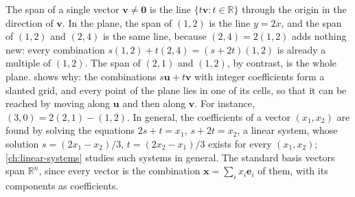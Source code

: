 The span of a single vector $\mathbf v\ne\mathbf 0$ is the line $\{t\mathbf v: t\in\mathbb R\}$ through the origin in the direction of $\mathbf v$. In the plane, the span of $(1,2)$ is the line $y=2x$, and the span of $(1,2)$ and $(2,4)$ is the same line, because $(2,4)=2(1,2)$ adds nothing new: every combination $s(1,2)+t(2,4)=(s+2t)(1,2)$ is already a multiple of $(1,2)$. The span of $(2,1)$ and $(1,2)$, by contrast, is the whole plane.  shows why: the combinations $s\mathbf u+t\mathbf v$ with integer coefficients form a slanted grid, and every point of the plane lies in one of its cells, so that it can be reached by moving along $\mathbf u$ and then along $\mathbf v$. For instance, $(3,0)=2(2,1)-(1,2)$. In general, the coefficients of a vector $(x_1,x_2)$ are found by solving the equations $2s+t=x_1$, $s+2t=x_2$, a linear system, whose solution $s=(2x_1-x_2)/3$, $t=(2x_2-x_1)/3$ exists for every $(x_1,x_2)$; \cref{ch:linear-systems} studies such systems in general. The standard basis vectors span $\mathbb R^n$, since every vector is the combination $\mathbf x=\sum_ix_i\mathbf e_i$ of them, with its components as coefficients.

